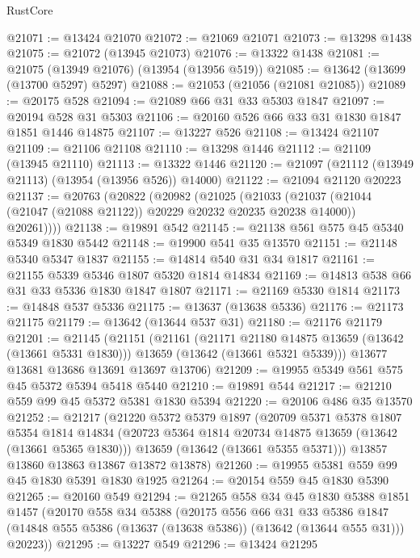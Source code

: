 \begin{lexlean}{RustCore}
\begin{coremodule}
@21071 := @13424 @21070
@21072 := @21069 @21071
@21073 := @13298 @1438
@21075 := @21072 (@13945 @21073)
@21076 := @13322 @1438
@21081 := @21075 (@13949 @21076) (@13954 (@13956 @519))
@21085 := @13642 (@13699 (@13700 @5297) @5297)
@21088 := @21053 (@21056 (@21081 @21085))
@21089 := @20175 @528
@21094 := @21089 @66 @31 @33 @5303 @1847
@21097 := @20194 @528 @31 @5303
@21106 := @20160 @526 @66 @33 @31 @1830 @1847 @1851 @1446 @14875
@21107 := @13227 @526
@21108 := @13424 @21107
@21109 := @21106 @21108
@21110 := @13298 @1446
@21112 := @21109 (@13945 @21110)
@21113 := @13322 @1446
@21120 := @21097 (@21112 (@13949 @21113) (@13954 (@13956 @526)) @14000)
@21122 := @21094 @21120 @20223
@21137 := @20763
    (@20822
      (@20982
        (@21025
          (@21033
            (@21037 (@21044 (@21047 (@21088 @21122)) @20229 @20232 @20235 @20238 @14000))
            @20261))))
@21138 := @19891 @542
@21145 := @21138 @561 @575 @45 @5340 @5349 @1830 @5442
@21148 := @19900 @541 @35 @13570
@21151 := @21148 @5340 @5347 @1837
@21155 := @14814 @540 @31 @34 @1817
@21161 := @21155 @5339 @5346 @1807 @5320 @1814 @14834
@21169 := @14813 @538 @66 @31 @33 @5336 @1830 @1847 @1807
@21171 := @21169 @5330 @1814
@21173 := @14848 @537 @5336
@21175 := @13637 (@13638 @5336)
@21176 := @21173 @21175
@21179 := @13642 (@13644 @537 @31)
@21180 := @21176 @21179
@21201 := @21145
    (@21151
      (@21161
        (@21171 @21180 @14875 @13659 (@13642 (@13661 @5331 @1830)))
        @13659
        (@13642 (@13661 @5321 @5339)))
      @13677
      @13681
      @13686
      @13691
      @13697
      @13706)
@21209 := @19955 @5349 @561 @575 @45 @5372 @5394 @5418 @5440
@21210 := @19891 @544
@21217 := @21210 @559 @99 @45 @5372 @5381 @1830 @5394
@21220 := @20106 @486 @35 @13570
@21252 := @21217
    (@21220
      @5372
      @5379
      @1897
      (@20709
        @5371
        @5378
        @1807
        @5354
        @1814
        @14834
        (@20723 @5364 @1814 @20734 @14875 @13659 (@13642 (@13661 @5365 @1830)))
        @13659
        (@13642 (@13661 @5355 @5371)))
      @13857
      @13860
      @13863
      @13867
      @13872
      @13878)
@21260 := @19955 @5381 @559 @99 @45 @1830 @5391 @1830 @1925
@21264 := @20154 @559 @45 @1830 @5390
@21265 := @20160 @549
@21294 := @21265
    @558
    @34
    @45
    @1830
    @5388
    @1851
    @1457
    (@20170
      @558
      @34
      @5388
      (@20175
        @556
        @66
        @31
        @33
        @5386
        @1847
        (@14848 @555 @5386 (@13637 (@13638 @5386)) (@13642 (@13644 @555 @31)))
        @20223))
@21295 := @13227 @549
@21296 := @13424 @21295

\end{coremodule}
\end{lexlean}
